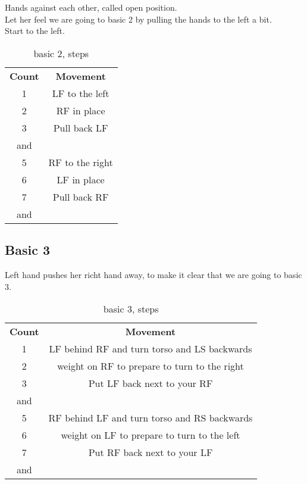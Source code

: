 Hands against each other, called open position.\\
Let her feel we are going to basic 2 by pulling the hands to the left a bit.\\
Start to the left.
\begin{table}[H]
\centering
\begin{tabular}{cc}
  \toprule
  \textbf{Count} & \textbf{Movement}\\
  \cmidrule(lr){1-1}\cmidrule(lr){2-2}
  1 & LF to the left\\
  2 & RF in place\\
  3 & Pull back LF\\
  and & \\
  5 & RF to the right\\
  6 & LF in place\\
  7 & Pull back RF\\
  and & \\
  \bottomrule
\end{tabular}
\label{basic2_steps}
\caption{basic 2, steps}
\end{table}

\subsection{Basic 3}

Left hand pushes her richt hand away, to make it clear that we are going to basic 3.\\
\begin{table}[H]
\centering
\begin{tabular}{cc}
  \toprule
  \textbf{Count} & \textbf{Movement}\\
  \cmidrule(lr){1-1}\cmidrule(lr){2-2}
  1 & LF behind RF and turn torso and LS backwards\\
  2 & weight on RF to prepare to turn to the right\\
  3 & Put LF back next to your RF\\
  and & \\
  5 & RF behind LF and turn torso and RS backwards\\
  6 & weight on LF to prepare to turn to the left\\
  7 & Put RF back next to your LF\\
  and & \\
  \bottomrule
\end{tabular}
\label{basic3_steps}
\caption{basic 3, steps}
\end{table}

